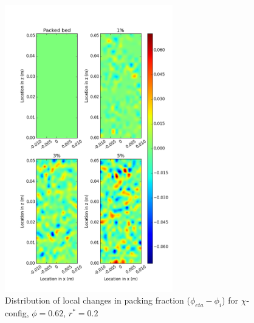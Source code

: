 \begin{figure}[!t]
    \centering
    \includegraphics[width = 0.65\textwidth]{figures/x-62-r125-1-deltas.png}
    \caption{Distribution of local changes in packing fraction ($\phi_{eta} - \phi_i$) for $\chi$-config, $\phi = 0.62$, $r^* = 0.2$}\label{fig:x-62-r125-deltas}
\end{figure}

